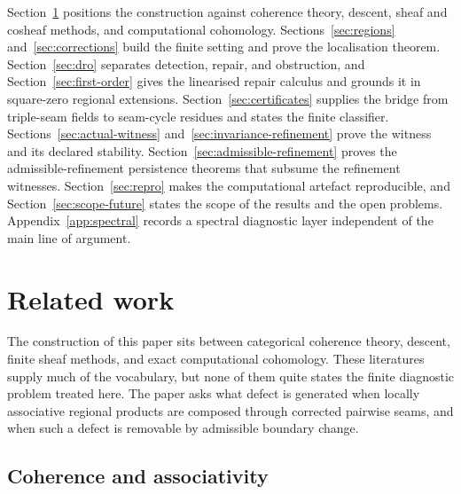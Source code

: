 \documentclass[11pt]{article}
\begin{document}
Section~\ref{sec:related} positions the construction against coherence theory, descent, sheaf and cosheaf methods, and computational cohomology. Sections~\ref{sec:regions} and~\ref{sec:corrections} build the finite setting and prove the localisation theorem. Section~\ref{sec:dro} separates detection, repair, and obstruction, and Section~\ref{sec:first-order} gives the linearised repair calculus and grounds it in square-zero regional extensions. Section~\ref{sec:certificates} supplies the bridge from triple-seam fields to seam-cycle residues and states the finite classifier. Sections~\ref{sec:actual-witness} and~\ref{sec:invariance-refinement} prove the witness and its declared stability. Section~\ref{sec:admissible-refinement} proves the admissible-refinement persistence theorems that subsume the refinement witnesses. Section~\ref{sec:repro} makes the computational artefact reproducible, and Section~\ref{sec:scope-future} states the scope of the results and the open problems. Appendix~\ref{app:spectral} records a spectral diagnostic layer independent of the main line of argument.

\section{Related work}
\label{sec:related}

The construction of this paper sits between categorical coherence theory, descent, finite sheaf methods, and exact computational cohomology. These literatures supply much of the vocabulary, but none of them quite states the finite diagnostic problem treated here. The paper asks what defect is generated when locally associative regional products are composed through corrected pairwise seams, and when such a defect is removable by admissible boundary change.

\subsection{Coherence and associativity}
\end{document}
